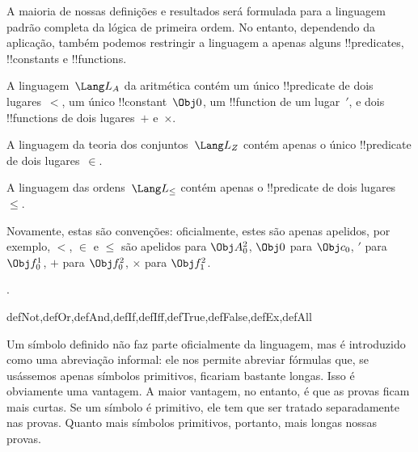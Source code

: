 \documentclass[../../../include/open-logic-section]{subfiles}
\begin{document}
A maioria de nossas definições e resultados será formulada para a linguagem padrão
completa da lógica de primeira ordem.  No entanto, dependendo da
aplicação, também podemos restringir a linguagem a apenas alguns
!!{predicate}s, !!{constant}s e !!{function}s.

\begin{ex}
A linguagem~$\Lang L_A$ da aritmética contém um único !!{predicate} de dois lugares~$<$,
um único !!{constant}~$\Obj 0$, um !!{function} de um lugar~$\prime$,
e dois !!{function}s de dois lugares~$+$ e~$\times$.
\end{ex}

\begin{ex}
A linguagem da teoria dos conjuntos~$\Lang L_Z$ contém apenas o único
!!{predicate} de dois lugares~$\in$.
\end{ex}

\begin{ex}
A linguagem das ordens~$\Lang L_\le$ contém apenas o !!{predicate}
de dois lugares~$\le$.
\end{ex}

Novamente, estas são convenções: oficialmente, estes são apenas apelidos,
por exemplo, $<$, $\in$ e $\le$ são apelidos para $\Obj A^2_0$, $\Obj 0$ para
$\Obj c_0$, $\prime$ para $\Obj f^1_0$, $+$ para $\Obj f^2_0$, $\times$ para
$\Obj f^2_1$.

.

\begin{tagblock}{defNot,defOr,defAnd,defIf,defIff,defTrue,defFalse,defEx,defAll}
\begin{explain}
Um símbolo definido não faz parte oficialmente da linguagem, mas é
introduzido como uma abreviação informal: ele nos permite abreviar
fórmulas que, se usássemos apenas símbolos primitivos, ficariam bastante
longas.  Isso é obviamente uma vantagem.  A maior vantagem, no entanto,
é que as provas ficam mais curtas.  Se um símbolo é primitivo, ele tem que ser
tratado separadamente nas provas. Quanto mais símbolos primitivos, portanto,
mais longas nossas provas.
\end{explain}
\end{tagblock}
\end{document}
